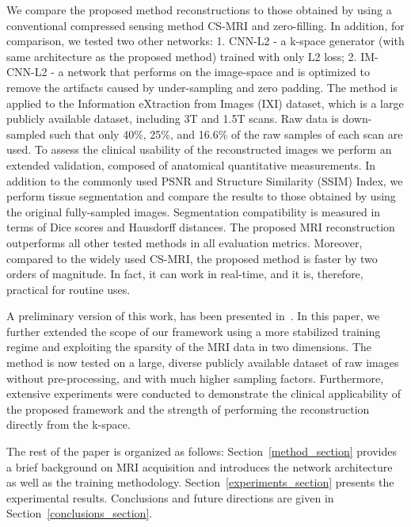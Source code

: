 \documentclass[10pt,journal,compsoc]{IEEEtran}
\begin{document}
We compare the proposed method reconstructions to those obtained by using a conventional compressed sensing method CS-MRI \cite{lustig2007sparse} and zero-filling. In addition, for comparison, we tested two other networks: 1. CNN-L2 - a k-space generator (with same architecture as the proposed method) trained with only L2 loss; 2. IM-CNN-L2 - a network that performs on the image-space and is optimized to remove the artifacts caused by under-sampling and zero padding.
The method is applied to the Information eXtraction from Images (IXI) dataset, which is a large publicly available dataset, including 3T and 1.5T scans. Raw data is down-sampled such that only 40\%, 25\%, and 16.6\% of the raw samples of each scan are used.
To assess the clinical usability of the reconstructed images we perform an extended validation, composed of anatomical quantitative measurements. In addition to the commonly used PSNR and Structure Similarity (SSIM) Index, we perform tissue segmentation and compare the results to those obtained by using the original fully-sampled images. Segmentation compatibility is measured in terms of Dice scores and Hausdorff distances.
The proposed MRI reconstruction outperforms all other tested methods in all evaluation metrics. Moreover, compared to the widely used CS-MRI, the proposed method is faster by two orders of magnitude. In fact, it can work in real-time, and it is, therefore, practical for routine uses.

A preliminary version of this work, has been presented in~\cite{shitrit2017accelerated}. In this paper, we further extended the scope of our framework using a more stabilized training regime and exploiting the sparsity of the MRI data in two dimensions. The method is now tested on a large, diverse publicly available dataset of raw images without pre-processing, and with much higher sampling factors. Furthermore, extensive experiments were conducted to demonstrate the clinical applicability of the proposed framework and the strength of performing the reconstruction directly from the k-space.

The rest of the paper is organized as follows: Section~\ref{method_section} provides a brief background on MRI acquisition and introduces the network architecture as well as the training methodology. Section~\ref{experiments_section} presents the experimental results. Conclusions and future directions are given in Section~\ref{conclusions_section}.
\end{document}
